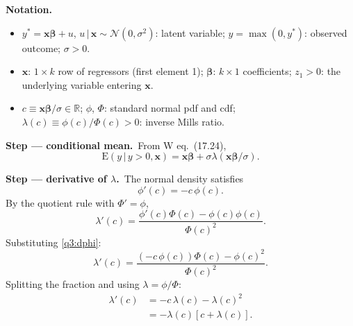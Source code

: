 \documentclass[11pt,a4paper]{article}
\numberwithin{equation}{questao}
\newenvironment{notacao}{\par\smallskip\noindent\textbf{Notation.}\begin{itemize}[leftmargin=1.4em,topsep=1pt,itemsep=0pt]\small}{\end{itemize}}
\newcommand{\passo}[2]{\par\smallskip\noindent\textbf{Step --- #1.}~#2}
\newcommand{\E}{\mathrm{E}}
\newcommand{\N}{\mathcal{N}}
\begin{document}
\begin{sol}
\begin{notacao}
\item $y^*=\mathbf{x}\boldsymbol\beta+u$, $u\,|\,\mathbf{x}\sim\N(0,\sigma^2)$: latent variable; $y=\max(0,y^*)$: observed outcome; $\sigma>0$.
\item $\mathbf{x}$: $1\times k$ row of regressors (first element 1); $\boldsymbol\beta$: $k\times1$ coefficients; $z_1>0$: the underlying variable entering $\mathbf{x}$.
\item $c\equiv\mathbf{x}\boldsymbol\beta/\sigma\in\mathbb{R}$; $\phi$, $\Phi$: standard normal pdf and cdf; $\lambda(c)\equiv\phi(c)/\Phi(c)>0$: inverse Mills ratio.
\end{notacao}

\passo{conditional mean}{From W eq.~(17.24),
\begin{equation}
\E(y\,|\,y>0,\mathbf{x})=\mathbf{x}\boldsymbol\beta+\sigma\lambda(\mathbf{x}\boldsymbol\beta/\sigma). \label{q3:mean}
\end{equation}}

\passo{derivative of $\lambda$}{The normal density satisfies
\begin{equation}
\phi'(c)=-c\,\phi(c). \label{q3:dphi}
\end{equation}
By the quotient rule with $\Phi'=\phi$,
\begin{equation*}
\lambda'(c)=\frac{\phi'(c)\Phi(c)-\phi(c)\phi(c)}{\Phi(c)^2}.
\end{equation*}
Substituting \eqref{q3:dphi}:
\begin{equation*}
\lambda'(c)=\frac{\left(-c\,\phi(c)\right)\Phi(c)-\phi(c)^2}{\Phi(c)^2}.
\end{equation*}
Splitting the fraction and using $\lambda=\phi/\Phi$:
\begin{align}
\lambda'(c)&=-c\,\lambda(c)-\lambda(c)^2\nonumber\\
&=-\lambda(c)\left[c+\lambda(c)\right]. \label{q3:dlam}
\end{align}}


\end{sol}
\end{document}
